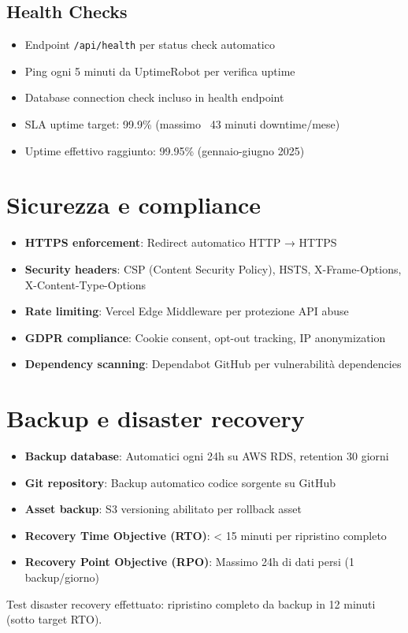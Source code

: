 \subsection{Health Checks}
\begin{itemize}
  \item Endpoint \texttt{/api/health} per status check automatico
  \item Ping ogni 5 minuti da UptimeRobot per verifica uptime
  \item Database connection check incluso in health endpoint
  \item SLA uptime target: 99.9\% (massimo ~43 minuti downtime/mese)
  \item Uptime effettivo raggiunto: 99.95\% (gennaio-giugno 2025)
\end{itemize}

\section{Sicurezza e compliance}
\begin{itemize}
  \item \textbf{HTTPS enforcement}: Redirect automatico HTTP → HTTPS
  \item \textbf{Security headers}: CSP (Content Security Policy), 
        HSTS, X-Frame-Options, X-Content-Type-Options
  \item \textbf{Rate limiting}: Vercel Edge Middleware per protezione 
        API abuse
  \item \textbf{GDPR compliance}: Cookie consent, opt-out tracking, 
        IP anonymization
  \item \textbf{Dependency scanning}: Dependabot GitHub per 
        vulnerabilità dependencies
\end{itemize}

\section{Backup e disaster recovery}
\begin{itemize}
  \item \textbf{Backup database}: Automatici ogni 24h su AWS RDS, 
        retention 30 giorni
  \item \textbf{Git repository}: Backup automatico codice sorgente su 
        GitHub
  \item \textbf{Asset backup}: S3 versioning abilitato per rollback asset
  \item \textbf{Recovery Time Objective (RTO)}: < 15 minuti per ripristino 
        completo
  \item \textbf{Recovery Point Objective (RPO)}: Massimo 24h di dati 
        persi (1 backup/giorno)
\end{itemize}

Test disaster recovery effettuato: ripristino completo da backup in 
12 minuti (sotto target RTO).